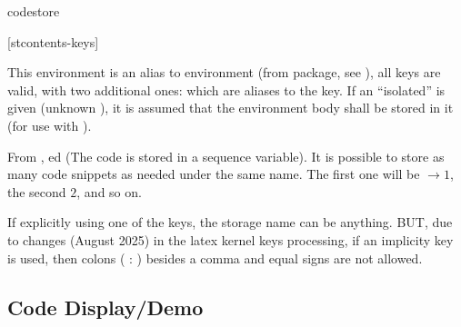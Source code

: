 \documentclass{article}
\begin{document}
\begin{codedescribe}[env]{codestore}
	\begin{codesyntax}
		\tsmacro{\begin{codestore}}[stcontents-keys]{}
    \tsmacro{\end{codestore}}{}
	\end{codesyntax}
This environment is an alias to  environment (from  package, see \cite{SCONTENTS}), all  keys are valid, with two additional ones:  which are aliases to the  key. If an ``isolated''  is given (unknown ), it is assumed that the environment body shall be stored in it (for use with \tsobj[code]{\tscode,\tsmergedcode,\tsdemo,\tsresult,\tsexec}).
\end{codedescribe}
\begin{tsremark}
  From ,  ed (The code is stored in a sequence variable). It is possible to store as many code snippets as needed under the same name. The first one will be $\rightarrow 1$, the second $2$, and so on.
\end{tsremark}
\begin{tsremark}
  If explicitly using one of the  keys, the storage name can be anything. BUT, due to changes (August 2025) in the latex kernel keys processing, if an implicity key is used,  then colons ( : ) besides a comma and equal signs are not allowed.
\end{tsremark}




\subsection{Code Display/Demo}\label{codelist}
\end{document}
